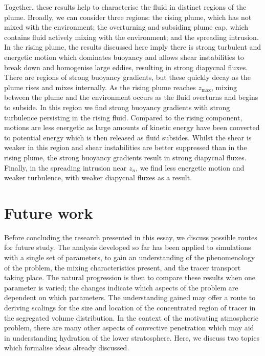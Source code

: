 \documentclass[a4paper]{article}
\begin{document}
Together, these results help to characterise the fluid in distinct regions of the plume. Broadly, we can
consider three regions: the rising plume, which has not mixed with the environment; the overturning and
subsiding plume cap, which contains fluid actively mixing with the environment; and the spreading intrusion.
In the rising plume, the results discussed here imply there is strong turbulent and energetic motion which
dominates buoyancy and allows shear instabilities to break down and homogenise large eddies, resulting in
strong diapycnal fluxes. There are regions of strong buoyancy gradients, but these quickly decay as the plume
rises and mixes internally. As the rising plume reaches $z_{\max}$, mixing between the plume and the
environment occurs as the fluid overturns and begins to subside. In this region we find strong buoyancy
gradients with strong turbulence persisting in the rising fluid. Compared to the rising component, motions are
less energetic as large amounts of kinetic energy have been converted to potential energy which is then
released as fluid subsides. Whilst the shear is weaker in this region and shear instabilities are better
suppressed than in the rising plume, the strong buoyancy gradients result in strong diapycnal fluxes.
Finally, in the spreading intrusion near $z_n$, we find less energetic motion and weaker turbulence, with
weaker diapycnal fluxes as a result.


\section{Future work}

Before concluding the research presented in this essay, we discuss possible routes for future study. The
analysis developed so far has been applied to simulations with a single set of parameters, to gain an
understanding of the phenomenology of the problem, the mixing characteristics present, and the tracer
transport taking place. The natural progression is then to compare these results when one parameter is
varied; the changes indicate which aspects of the problem are dependent on which parameters. The understanding
gained may offer a route to deriving scalings for the size and location of the concentrated region of tracer
in the segregated volume distribution. In the context of the motivating atmospheric problem, there are many
other aspects of convective penetration which may aid in understanding hydration of the lower stratosphere.
Here, we discuss two topics which formalise ideas already discussed. 
\end{document}
